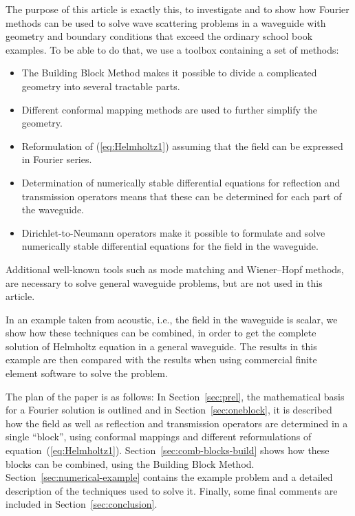 \documentclass[a4paper,11pt]{article}
\begin{document}
The purpose of this article is exactly this, to investigate and to
show how Fourier methods can be used to solve wave scattering problems
in a waveguide with geometry and boundary conditions that exceed the
ordinary school book examples. To be able to do that, we use a toolbox
containing a set of methods:
\begin{itemize}
\item The Building Block Method makes it possible to divide a
  complicated geometry into several tractable parts.
\item Different conformal mapping methods are used to further simplify
  the geometry.
\item Reformulation of (\ref{eq:Helmholtz1}) assuming that the field
  can be expressed in Fourier series.
\item Determination of numerically stable differential equations for
  reflection and transmission operators means that these can be
  determined for each part of the waveguide.
\item Dirichlet-to-Neumann operators make it possible to formulate and
  solve numerically stable differential equations for the field in the
  waveguide.
\end{itemize}

Additional well-known tools such as mode matching and Wiener--Hopf
methods, are necessary to solve general waveguide problems, but are
not used in this article.

In an example taken from acoustic, i.e., the field in the waveguide
is scalar, we show how these techniques can be combined, in order to
get the complete solution of Helmholtz equation in a general
waveguide. The results in this example are then compared with the
results when using commercial finite element software to solve the
problem.

The plan of the paper is as follows: In Section~\ref{sec:prel}, the
mathematical basis for a Fourier solution is outlined and in
Section~\ref{sec:oneblock}, it is described how the field as well as
reflection and transmission operators are determined in a single
``block'', using conformal mappings and different reformulations of
equation~(\ref{eq:Helmholtz1}).  Section~\ref{sec:comb-blocks-build}
shows how these blocks can be combined, using the Building Block
Method. Section~\ref{sec:numerical-example} contains the example
problem and a detailed description of the techniques used to solve
it. Finally, some final comments are included in
Section~\ref{sec:conclusion}.
\end{document}

